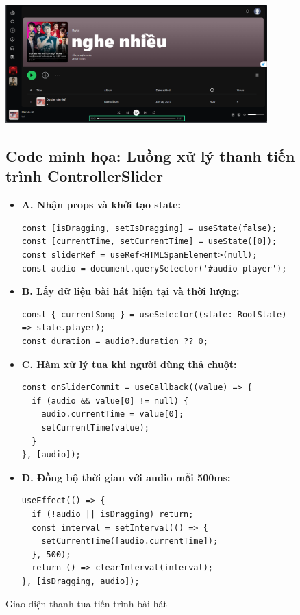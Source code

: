 \begin{figure}[H]
  \centering
  \includegraphics[width=0.9\textwidth]{imgs/trienkhaife/slider.png}
  \caption{Giao diện thanh tua tiến trình bài hát}
  \subsection*{Code minh họa: Luồng xử lý thanh tiến trình ControllerSlider}

\begin{itemize}
  \item \textbf{A. Nhận props và khởi tạo state:}
\begin{verbatim}
const [isDragging, setIsDragging] = useState(false);
const [currentTime, setCurrentTime] = useState([0]);
const sliderRef = useRef<HTMLSpanElement>(null);
const audio = document.querySelector('#audio-player');
\end{verbatim}

  \item \textbf{B. Lấy dữ liệu bài hát hiện tại và thời lượng:}
\begin{verbatim}
const { currentSong } = useSelector((state: RootState) => state.player);
const duration = audio?.duration ?? 0;
\end{verbatim}

  \item \textbf{C. Hàm xử lý tua khi người dùng thả chuột:}
\begin{verbatim}
const onSliderCommit = useCallback((value) => {
  if (audio && value[0] != null) {
    audio.currentTime = value[0];
    setCurrentTime(value);
  }
}, [audio]);
\end{verbatim}

  \item \textbf{D. Đồng bộ thời gian với audio mỗi 500ms:}
\begin{verbatim}
useEffect(() => {
  if (!audio || isDragging) return;
  const interval = setInterval(() => {
    setCurrentTime([audio.currentTime]);
  }, 500);
  return () => clearInterval(interval);
}, [isDragging, audio]);
\end{verbatim}


\end{itemize}
\end{figure}
